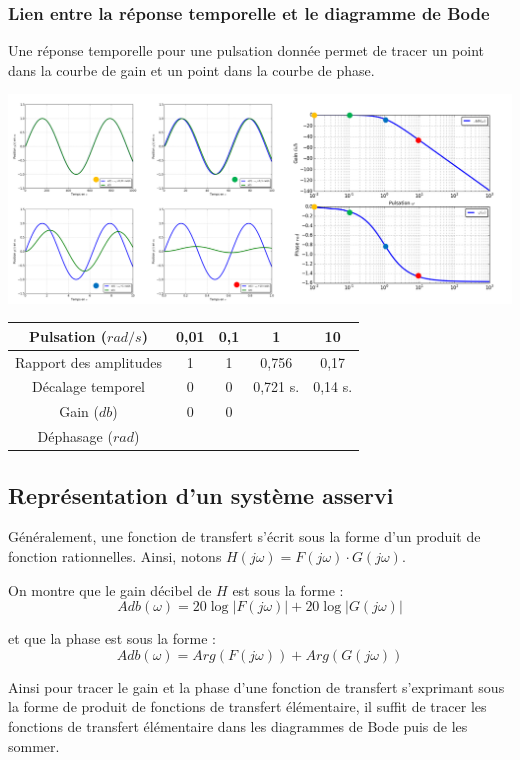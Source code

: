 \documentclass[10pt,oneside]{article}
\begin{document}
\subsubsection{Lien entre la réponse temporelle et le diagramme de Bode}
Une réponse temporelle pour une pulsation donnée permet de tracer un point dans la courbe de gain et un point dans la courbe de phase.
\begin{center}
\includegraphics[width=\textwidth]{png/temp_bode}
\end{center}

\begin{center}
\begin{tabular}{|c|c|c|c|c|}
\hline
Pulsation ($rad/s$) & 0,01 & 0,1 & 1 & 10\\
\hline
Rapport des amplitudes & 1 & 1 & 0,756 & 0,17 \\
\hline
Décalage temporel & 0 & 0 &0,721 s. &0,14 s. \\
\hline
Gain ($db$) & 0 & 0 & & \\
\hline
Déphasage ($rad$) & & & & \\
\hline
\end{tabular}
\end{center}

\subsection{Représentation d'un système asservi}

Généralement, une fonction de transfert s'écrit sous la forme d'un produit de fonction rationnelles. Ainsi, notons $H(j\omega)=F(j\omega) \cdot G(j\omega)$. 

On montre que le gain décibel de $H$ est sous la forme :
$$
Adb(\omega) = 20 \log |F(j\omega) |+20 \log |G(j\omega) |
$$

et que la phase est sous la forme :
$$
Adb(\omega) = Arg \left(F(j\omega) \right)+Arg \left(G(j\omega) \right)
$$

Ainsi pour tracer le gain et la phase d'une fonction de transfert s'exprimant sous la forme de produit de fonctions de transfert élémentaire, il suffit de tracer les fonctions de transfert élémentaire dans les diagrammes de Bode puis de les sommer.
\end{document}
